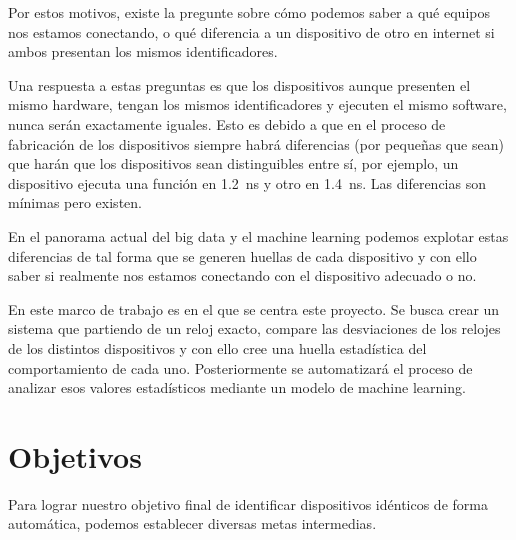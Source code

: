 Por estos motivos, existe la pregunte sobre cómo podemos saber a qué equipos nos estamos conectando, o qué diferencia a un dispositivo de otro en internet si ambos presentan los mismos identificadores.

Una respuesta a estas preguntas es que los dispositivos aunque presenten el mismo hardware, tengan los mismos identificadores y ejecuten el mismo software, nunca serán exactamente iguales. Esto es debido a que en el proceso de fabricación de los dispositivos siempre habrá diferencias (por pequeñas que sean) que harán que los dispositivos sean distinguibles entre sí, por ejemplo, un dispositivo ejecuta una función en \SI{1.2}{\nano\second} y otro en \SI{1.4}{\nano\second}. Las diferencias son mínimas pero existen.

En el panorama actual del big data y el machine learning podemos explotar estas diferencias de tal forma que se generen huellas de cada dispositivo y con ello saber si realmente nos estamos conectando con el dispositivo adecuado o no.

En este marco de trabajo es en el que se centra este proyecto. Se busca crear un sistema que partiendo de un reloj exacto, compare las desviaciones de los relojes de los distintos dispositivos y con ello cree una huella estadística del comportamiento de cada uno. Posteriormente se automatizará el proceso de analizar esos valores estadísticos mediante un modelo de machine learning.

\section{Objetivos}

Para lograr nuestro objetivo final de identificar dispositivos idénticos de forma automática, podemos establecer diversas metas intermedias.

